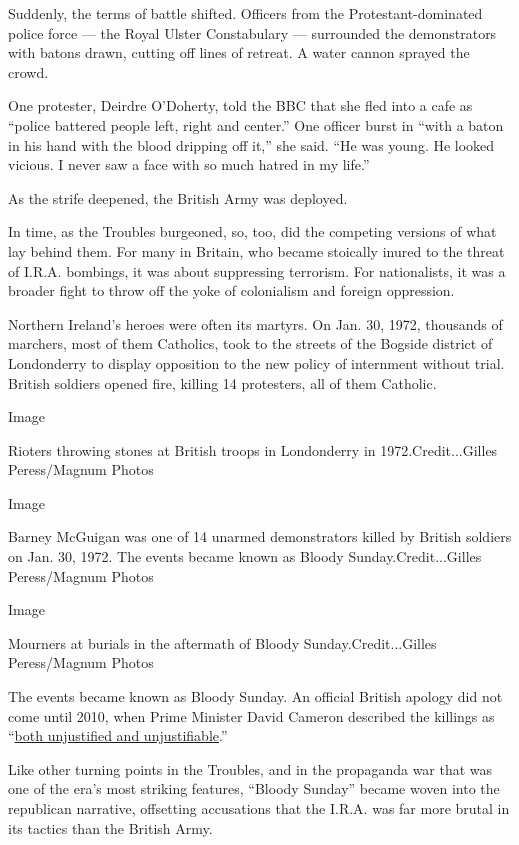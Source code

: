 Suddenly, the terms of battle shifted. Officers from the
Protestant-dominated police force --- the Royal Ulster Constabulary ---
surrounded the demonstrators with batons drawn, cutting off lines of
retreat. A water cannon sprayed the crowd.

One protester, Deirdre O'Doherty, told the BBC that she fled into a cafe
as ``police battered people left, right and center.'' One officer burst
in ``with a baton in his hand with the blood dripping off it,'' she
said. ``He was young. He looked vicious. I never saw a face with so much
hatred in my life.''

As the strife deepened, the British Army was deployed.

In time, as the Troubles burgeoned, so, too, did the competing versions
of what lay behind them. For many in Britain, who became stoically
inured to the threat of I.R.A. bombings, it was about suppressing
terrorism. For nationalists, it was a broader fight to throw off the
yoke of colonialism and foreign oppression.

Northern Ireland's heroes were often its martyrs. On Jan. 30, 1972,
thousands of marchers, most of them Catholics, took to the streets of
the Bogside district of Londonderry to display opposition to the new
policy of internment without trial. British soldiers opened fire,
killing 14 protesters, all of them Catholic.

Image

Rioters throwing stones at British troops in Londonderry in
1972.Credit...Gilles Peress/Magnum Photos

Image

Barney McGuigan was one of 14 unarmed demonstrators killed by British
soldiers on Jan. 30, 1972. The events became known as Bloody
Sunday.Credit...Gilles Peress/Magnum Photos

Image

Mourners at burials in the aftermath of Bloody Sunday.Credit...Gilles
Peress/Magnum Photos

The events became known as Bloody Sunday. An official British apology
did not come until 2010, when Prime Minister David Cameron described the
killings as
``\href{https://www.nytimes.com/2010/06/16/world/europe/16nireland.html}{both
unjustified and unjustifiable}.''

Like other turning points in the Troubles, and in the propaganda war
that was one of the era's most striking features, ``Bloody Sunday''
became woven into the republican narrative, offsetting accusations that
the I.R.A. was far more brutal in its tactics than the British Army.

